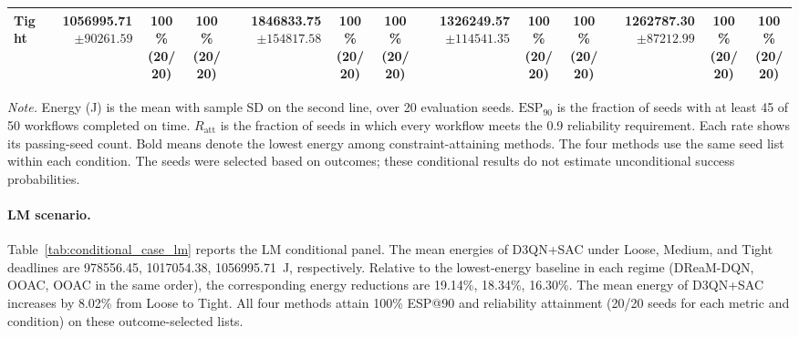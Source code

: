 \documentclass[10pt]{article}
\begin{document}
\begin{table}[!htbp]
\begin{tabular}{@{}l*{4}{rcc}@{}}
Tight & \shortstack[r]{\textbf{1056995.71}\\$\pm 90261.59$} & \shortstack[c]{100\%\\(20/20)} & \shortstack[c]{100\%\\(20/20)} & \shortstack[r]{1846833.75\\$\pm 154817.58$} & \shortstack[c]{100\%\\(20/20)} & \shortstack[c]{100\%\\(20/20)} & \shortstack[r]{1326249.57\\$\pm 114541.35$} & \shortstack[c]{100\%\\(20/20)} & \shortstack[c]{100\%\\(20/20)} & \shortstack[r]{1262787.30\\$\pm 87212.99$} & \shortstack[c]{100\%\\(20/20)} & \shortstack[c]{100\%\\(20/20)} \\
\bottomrule
\end{tabular}
\par\vspace{3pt}
\parbox{\textwidth}{\footnotesize
\textit{Note.} Energy (J) is the mean with sample SD on the second line, over 20 evaluation seeds.
$\mathrm{ESP}_{90}$ is the fraction of seeds with at least 45 of 50 workflows completed on time.
$R_{\mathrm{att}}$ is the fraction of seeds in which every workflow meets the 0.9 reliability requirement.
Each rate shows its passing-seed count. Bold means denote the lowest energy among constraint-attaining methods.
The four methods use the same seed list within each condition.
The seeds were selected based on outcomes; these conditional results do not estimate unconditional success probabilities.}
\endgroup
\end{table}

\paragraph{LM scenario.}
Table~\ref{tab:conditional_case_lm} reports the LM conditional panel. The mean energies of D3QN+SAC under Loose, Medium, and Tight deadlines are 978556.45, 1017054.38, 1056995.71~J, respectively. Relative to the lowest-energy baseline in each regime (DReaM-DQN, OOAC, OOAC in the same order), the corresponding energy reductions are 19.14\%, 18.34\%, 16.30\%. The mean energy of D3QN+SAC increases by 8.02\% from Loose to Tight. All four methods attain 100\% ESP@90 and reliability attainment (20/20 seeds for each metric and condition) on these outcome-selected lists.
\clearpage
\end{document}
